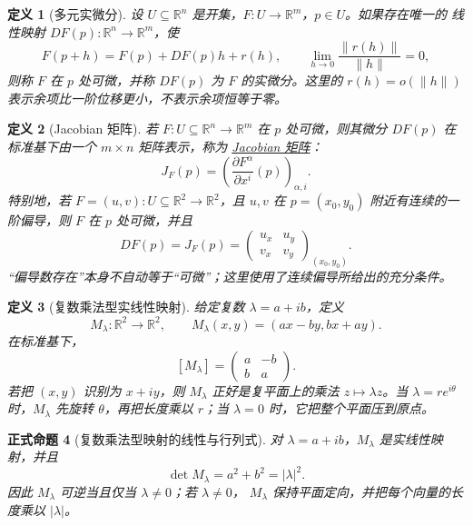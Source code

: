 \documentclass[UTF8,fontset=none,a4paper,11pt]{ctexart}
\theoremstyle{foundation-definition}
\newtheorem{definition}{定义}[section]
\theoremstyle{foundation-theorem}
\theoremstyle{foundation-proposition}
\newtheorem{proposition}[definition]{正式命题}
\theoremstyle{foundation-example}
\theoremstyle{foundation-remark}
\theoremstyle{foundation-theorem}
\newcommand{\term}[2]{\hyperref[#1]{#2}}
\begin{document}
\begin{definition}[多元实微分]\label{def:total-differential}
设 \(U\subseteq\mathbb R^n\) 是开集，\(F:U\to\mathbb R^m\)，\(p\in U\)。如果存在唯一的
线性映射 \(DF(p):\mathbb R^n\to\mathbb R^m\)，使
\[
 F(p+h)=F(p)+DF(p)h+r(h),\qquad
 \lim_{h\to0}\frac{\lVert r(h)\rVert}{\lVert h\rVert}=0,
\]
则称 \(F\) 在 \(p\) 处可微，并称 \(DF(p)\) 为 \(F\) 的实微分。这里的
\(r(h)=o(\lVert h\rVert)\) 表示余项比一阶位移更小，不表示余项恒等于零。

\end{definition}

\begin{definition}[Jacobian 矩阵]\label{def:jacobian-matrix}
若 \(F:U\subseteq\mathbb R^n\to\mathbb R^m\) 在 \(p\) 处可微，则其微分
\(DF(p)\) 在标准基下由一个 \(m\times n\) 矩阵表示，称为
\term{def:jacobian-matrix}{Jacobian 矩阵}：
\[
 J_F(p)=\left(\frac{\partial F^\alpha}{\partial x^i}(p)\right)_{\alpha,i}.
\]
特别地，若 \(F=(u,v):U\subseteq\mathbb R^2\to\mathbb R^2\)，且 \(u,v\) 在 \(p=(x_0,y_0)\)
附近有连续的一阶偏导，则 \(F\) 在 \(p\) 处可微，并且
\[
 DF(p)=J_F(p)=
 \begin{pmatrix}u_x&u_y\\v_x&v_y\end{pmatrix}_{(x_0,y_0)}.
\]
“偏导数存在”本身不自动等于“可微”；这里使用了连续偏导所给出的充分条件。
\end{definition}

\begin{definition}[复数乘法型实线性映射]\label{def:complex-multiplication-linear-map}
给定复数 \(\lambda=a+ib\)，定义
\[
M_\lambda:\mathbb R^2\longrightarrow\mathbb R^2,\qquad
M_\lambda(x,y)=(ax-by,bx+ay).
\]
在标准基下，
\[
[M_\lambda]=
\begin{pmatrix}a&-b\\ b&a\end{pmatrix}.
\]
若把 \((x,y)\) 识别为 \(x+iy\)，则 \(M_\lambda\) 正好是复平面上的乘法
\(z\mapsto\lambda z\)。当 \(\lambda=re^{i\theta}\) 时，\(M_\lambda\) 先旋转
\(\theta\)，再把长度乘以 \(r\)；当 \(\lambda=0\) 时，它把整个平面压到原点。
\end{definition}

\begin{proposition}[复数乘法型映射的线性与行列式]\label{prop:complex-multiplication-jacobian}
对 \(\lambda=a+ib\)，\(M_\lambda\) 是实线性映射，并且
\[
\det M_\lambda=a^2+b^2=|\lambda|^2.
\]
因此 \(M_\lambda\) 可逆当且仅当 \(\lambda\ne0\)；若 \(\lambda\ne0\)，
\(M_\lambda\) 保持平面定向，并把每个向量的长度乘以 \(|\lambda|\)。
\end{proposition}
\end{document}
